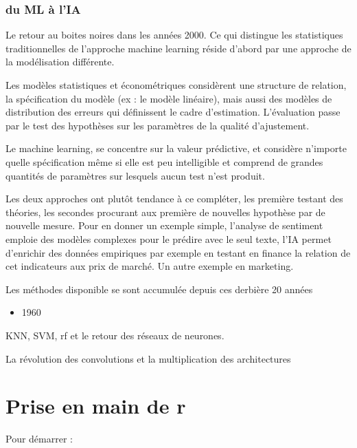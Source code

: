 \documentclass[
]{book}
\providecommand{\tightlist}{%
  \setlength{\itemsep}{0pt}\setlength{\parskip}{0pt}}
\begin{document}
\hypertarget{du-ml-uxe0-lia}{%
\subsection{du ML à l'IA}\label{du-ml-uxe0-lia}}

Le retour au boites noires dans les années 2000. Ce qui distingue les statistiques traditionnelles de l'approche machine learning réside d'abord par une approche de la modélisation différente.

Les modèles statistiques et économétriques considèrent une structure de relation, la spécification du modèle (ex : le modèle linéaire), mais aussi des modèles de distribution des erreurs qui définissent le cadre d'estimation. L'évaluation passe par le test des hypothèses sur les paramètres de la qualité d'ajustement.

Le machine learning, se concentre sur la valeur prédictive, et considère n'importe quelle spécification même si elle est peu intelligible et comprend de grandes quantités de paramètres sur lesquels aucun test n'est produit.

Les deux approches ont plutôt tendance à ce compléter, les première testant des théories, les secondes procurant aux première de nouvelles hypothèse par de nouvelle mesure. Pour en donner un exemple simple, l'analyse de sentiment emploie des modèles complexes pour le prédire avec le seul texte, l'IA permet d'enrichir des données empiriques par exemple en testant en finance la relation de cet indicateurs aux prix de marché. Un autre exemple en marketing.

Les méthodes disponible se sont accumulée depuis ces derbière 20 années

\begin{itemize}
\tightlist
\item
  1960
\end{itemize}

KNN, SVM, rf et le retour des réseaux de neurones.

La révolution des convolutions et la multiplication des architectures

\hypertarget{prise-en-main-de-r}{%
\chapter{Prise en main de r}\label{prise-en-main-de-r}}

Pour démarrer :
\end{document}
